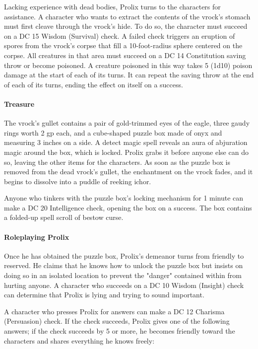 \documentclass[10pt,a4paper,twoside,twocolumn,openany,nodeprecatedcode]{dndbook}
\begin{document}
Lacking experience with dead bodies, Prolix turns to the characters for assistance. A character who wants to extract the contents of the vrock's stomach must first cleave through the vrock's hide. To do so, the character must succeed on a DC 15 Wisdom (Survival) check. A failed check triggers an eruption of spores from the vrock's corpse that fill a 10-foot-radius sphere centered on the corpse. All creatures in that area must succeed on a DC 14 Constitution saving throw or become poisoned. A creature poisoned in this way takes 5 (1d10) poison damage at the start of each of its turns. It can repeat the saving throw at the end of each of its turns, ending the effect on itself on a success.

\paragraph{Treasure}
The vrock's gullet contains a pair of gold-trimmed eyes of the eagle, three gaudy rings worth 2 gp each, and a cube-shaped puzzle box made of onyx and measuring 3 inches on a side. A detect magic spell reveals an aura of abjuration magic around the box, which is locked. Prolix grabs it before anyone else can do so, leaving the other items for the characters. As soon as the puzzle box is removed from the dead vrock's gullet, the enchantment on the vrock fades, and it begins to dissolve into a puddle of reeking ichor.

Anyone who tinkers with the puzzle box's locking mechanism for 1 minute can make a DC 20 Intelligence check, opening the box on a success. The box contains a folded-up spell scroll of bestow curse.

\paragraph{Roleplaying Prolix}
Once he has obtained the puzzle box, Prolix's demeanor turns from friendly to reserved. He claims that he knows how to unlock the puzzle box but insists on doing so in an isolated location to prevent the "danger" contained within from hurting anyone. A character who succeeds on a DC 10 Wisdom (Insight) check can determine that Prolix is lying and trying to sound important.

A character who presses Prolix for answers can make a DC 12 Charisma (Persuasion) check. If the check succeeds, Prolix gives one of the following answers; if the check succeeds by 5 or more, he becomes friendly toward the characters and shares everything he knows freely:
\end{document}
